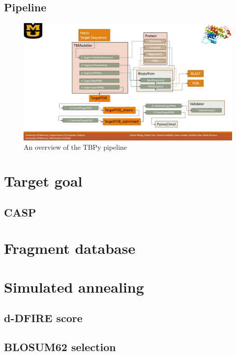 \documentclass{article}
\begin{document}
\subsection{Pipeline}
\begin{figure}[H]
\begin{center}
\includegraphics[width=\textwidth]{workflow}
\caption{An overview of the TBPy pipeline}
\label{Fig:blosum}
\end{center}
\end{figure}

\section{Target goal}

\subsection{CASP}

\section{Fragment database}

\section{Simulated annealing}

\subsection{d-DFIRE score}

\subsection{BLOSUM62 selection}
\end{document}
